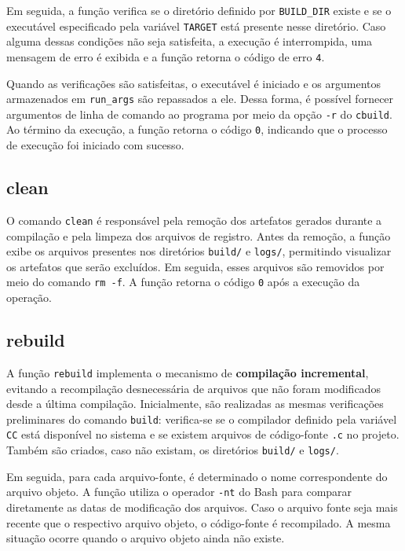 \documentclass[a4paper]{article}
\begin{document}
Em seguida, a função verifica se o diretório definido por
\texttt{BUILD\_DIR} existe e se o executável especificado pela variável
\texttt{TARGET} está presente nesse diretório. Caso alguma dessas condições
não seja satisfeita, a execução é interrompida, uma mensagem de erro é
exibida e a função retorna o código de erro \texttt{4}.

Quando as verificações são satisfeitas, o executável é iniciado e os
argumentos armazenados em \texttt{run\_args} são repassados a ele. Dessa
forma, é possível fornecer argumentos de linha de comando ao programa por
meio da opção \texttt{-r} do \texttt{cbuild}. Ao término da execução, a
função retorna o código \texttt{0}, indicando que o processo de execução foi
iniciado com sucesso.

\subsection{clean}

O comando \texttt{clean} é responsável pela remoção dos artefatos gerados
durante a compilação e pela limpeza dos arquivos de registro. Antes da
remoção, a função exibe os arquivos presentes nos diretórios
\texttt{build/} e \texttt{logs/}, permitindo visualizar os artefatos que
serão excluídos. Em seguida, esses arquivos são removidos por meio do
comando \texttt{rm -f}. A função retorna o código \texttt{0} após a
execução da operação.

\subsection{rebuild}

A função \texttt{rebuild} implementa o mecanismo de \textbf{compilação
incremental}, evitando a recompilação desnecessária de arquivos que não
foram modificados desde a última compilação. Inicialmente, são realizadas
as mesmas verificações preliminares do comando \texttt{build}: verifica-se
se o compilador definido pela variável \texttt{CC} está disponível no
sistema e se existem arquivos de código-fonte \texttt{.c} no projeto.
Também são criados, caso não existam, os diretórios \texttt{build/} e
\texttt{logs/}.

Em seguida, para cada arquivo-fonte, é determinado o nome correspondente
do arquivo objeto. A função utiliza o operador \texttt{-nt} do Bash para
comparar diretamente as datas de modificação dos arquivos. Caso o arquivo
fonte seja mais recente que o respectivo arquivo objeto, o código-fonte é
recompilado. A mesma situação ocorre quando o arquivo objeto ainda não
existe.
\end{document}
